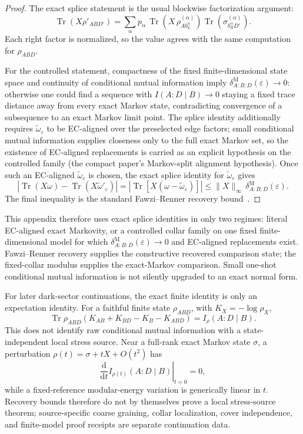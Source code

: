 \documentclass[11pt]{article}
\theoremstyle{remark}
\theoremstyle{plain}
\begin{document}
\begin{proof}
The exact splice statement is the usual blockwise factorization argument:
\[
\operatorname{Tr}(X\rho'_{AB D'})
=
\sum_\alpha
p_\alpha\,
\operatorname{Tr}\!\left(
X\, \rho^{(\alpha)}_{A b_L^\alpha}
\right)
\operatorname{Tr}\!\left(\sigma_{b_R^\alpha D'}^{(\alpha)}\right).
\]
Each right factor is normalized, so the value agrees with the same computation for \(\rho_{ABD}\).

For the controlled statement, compactness of the fixed finite-dimensional state space and continuity of conditional mutual information imply \(\delta^{\mathrm M}_{A:B:D}(\varepsilon)\to0\): otherwise one could find a sequence with \(I(A:D\mid B)\to0\) staying a fixed trace distance away from every exact Markov state, contradicting convergence of a subsequence to an exact Markov limit point. The splice identity additionally requires \(\widetilde\omega_\varepsilon\) to be EC-aligned over the preselected edge factors; small conditional mutual information supplies closeness only to the full exact Markov set, so the existence of EC-aligned replacements is carried as an explicit hypothesis on the controlled family (the compact paper's Markov-split alignment hypothesis). Once such an EC-aligned \(\widetilde\omega_\varepsilon\) is chosen, the exact splice identity for \(\widetilde\omega_\varepsilon\) gives
\[
\left|
\operatorname{Tr}(X\omega)-\operatorname{Tr}(X\widetilde\omega'_\varepsilon)
\right|
=
\left|
\operatorname{Tr}\!\left[X(\omega-\widetilde\omega_\varepsilon)\right]
\right|
\le
\|X\|_\infty\,
\delta^{\mathrm M}_{A:B:D}(\varepsilon).
\]
The final inequality is the standard Fawzi--Renner recovery bound~\cite{fawziRenner15}.
\end{proof}

This appendix therefore uses exact splice identities in only two regimes: literal EC-aligned exact Markovity, or a controlled collar family on one fixed finite-dimensional model for which \(\delta^{\mathrm M}_{A:B:D}(\varepsilon)\to0\) and EC-aligned replacements exist. Fawzi--Renner recovery supplies the constructive recovered comparison state; the fixed-collar modulus supplies the exact-Markov comparison. Small one-shot conditional mutual information is not silently upgraded to an exact normal form.

For later dark-sector continuations, the exact finite identity is only an
expectation identity. For a faithful finite state \(\rho_{ABD}\), with
\(K_X=-\log\rho_X\),
\[
  \operatorname{Tr}\rho_{ABD}(K_{AB}+K_{BD}-K_B-K_{ABD})
  =
  I_\rho(A:D\mid B).
\]
This does not identify raw conditional mutual information with a state-independent local stress source.
Near a full-rank exact Markov state \(\sigma\), a perturbation
\(\rho(t)=\sigma+tX+O(t^2)\) has
\[
  \left.\frac{\mathrm d}{\mathrm d t}I_{\rho(t)}(A:D\mid B)\right|_{t=0}=0,
\]
while a fixed-reference modular-energy variation is generically linear in
\(t\). Recovery bounds therefore do not by themselves prove a local
stress-source theorem; source-specific coarse graining, collar localization,
cover independence, and finite-model proof receipts are separate continuation
data.
\end{document}
